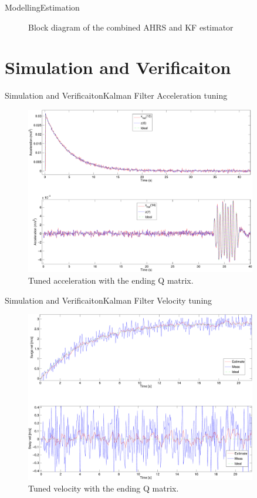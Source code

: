 \documentclass[10pt,handout]{beamer}
\begin{document}
\begin{frame}{Modelling}{Estimation}
  \begin{figure}
    {\tiny }
	  \caption{\scriptsize Block diagram of the combined AHRS and KF estimator}
  \end{figure}
\end{frame}

\section{Simulation and Verificaiton}
\begin{frame}{Simulation and Verificaiton}{Kalman Filter}
Acceleration tuning
  \begin{figure}
    \includegraphics[width=0.9\textwidth]{../../code/matlab/accel0,00001}
    \caption{\scriptsize Tuned acceleration with the ending Q matrix.}
    \label{fig:acceltuning}
  \end{figure}
\end{frame}

\begin{frame}{Simulation and Verificaiton}{Kalman Filter}
Velocity tuning
  \begin{figure}
    \includegraphics[width=0.9\textwidth]{../../code/matlab/uv0,00001}
    \caption{\scriptsize Tuned velocity with the ending Q matrix.}
    \label{fig:uvtuning}
  \end{figure}
\end{frame}
\end{document}
